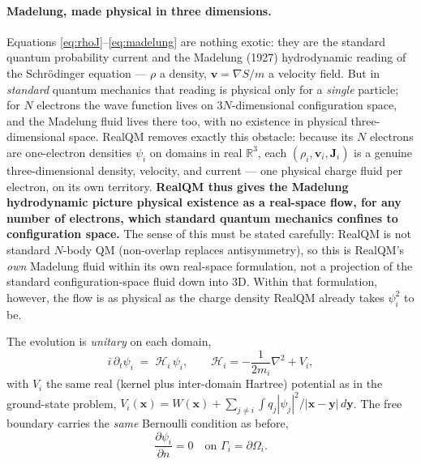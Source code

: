 \documentclass[11pt]{article}
\begin{document}
\paragraph{Madelung, made physical in three dimensions.} Equations \eqref{eq:rhoJ}--\eqref{eq:madelung}
are nothing exotic: they are the standard quantum probability current and the Madelung (1927) hydrodynamic
reading of the Schr\"odinger equation --- $\rho$ a density, $\mathbf v=\nabla S/m$ a velocity field. But
in \emph{standard} quantum mechanics that reading is physical only for a \emph{single} particle; for $N$
electrons the wave function lives on $3N$-dimensional configuration space, and the Madelung fluid lives
there too, with no existence in physical three-dimensional space. RealQM removes exactly this obstacle:
because its $N$ electrons are one-electron densities $\psi_i$ on domains in real $\mathbb R^3$, each
$(\rho_i,\mathbf v_i,\mathbf J_i)$ is a genuine three-dimensional density, velocity, and current --- one
physical charge fluid per electron, on its own territory. \textbf{RealQM thus gives the Madelung
hydrodynamic picture physical existence as a real-space flow, for any number of electrons, which standard
quantum mechanics confines to configuration space.} The sense of this must be stated carefully: RealQM is
not standard $N$-body QM (non-overlap replaces antisymmetry), so this is RealQM's \emph{own} Madelung
fluid within its own real-space formulation, not a projection of the standard configuration-space fluid
down into 3D. Within that formulation, however, the flow is as physical as the charge density RealQM
already takes $\psi_i^2$ to be.

The evolution is \emph{unitary} on each domain,
\begin{equation}
i\,\partial_t\psi_i \;=\; \mathcal H_i\,\psi_i,
\qquad
\mathcal H_i = -\frac{1}{2m_i}\nabla^2 + V_i ,
\label{eq:tdse}
\end{equation}
with $V_i$ the same real (kernel plus inter-domain Hartree) potential as in the ground-state problem,
$V_i(\mathbf x)=W(\mathbf x)+\sum_{j\ne i}\int q_j|\psi_j|^2/|\mathbf x-\mathbf y|\,d\mathbf y$. The free
boundary carries the \emph{same} Bernoulli condition as before,
\begin{equation}
\frac{\partial\psi_i}{\partial n}=0 \quad\text{on }\Gamma_i=\partial\Omega_i .
\label{eq:neumann}
\end{equation}
\end{document}
